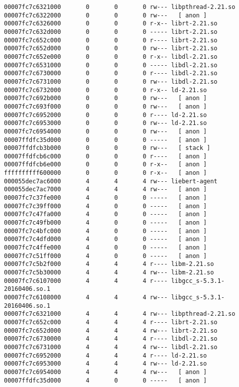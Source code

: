 \begin{verbatim}
00007fc7c6321000       0       0       0 rw--- libpthread-2.21.so
00007fc7c6322000       0       0       0 rw---   [ anon ]
00007fc7c6326000       0       0       0 r-x-- librt-2.21.so
00007fc7c632d000       0       0       0 ----- librt-2.21.so
00007fc7c652c000       0       0       0 r---- librt-2.21.so
00007fc7c652d000       0       0       0 rw--- librt-2.21.so
00007fc7c652e000       0       0       0 r-x-- libdl-2.21.so
00007fc7c6531000       0       0       0 ----- libdl-2.21.so
00007fc7c6730000       0       0       0 r---- libdl-2.21.so
00007fc7c6731000       0       0       0 rw--- libdl-2.21.so
00007fc7c6732000       0       0       0 r-x-- ld-2.21.so
00007fc7c692b000       0       0       0 rw---   [ anon ]
00007fc7c693f000       0       0       0 rw---   [ anon ]
00007fc7c6952000       0       0       0 r---- ld-2.21.so
00007fc7c6953000       0       0       0 rw--- ld-2.21.so
00007fc7c6954000       0       0       0 rw---   [ anon ]
00007ffdfc35d000       0       0       0 -----   [ anon ]
00007ffdfcb3b000       0       0       0 rw---   [ stack ]
00007ffdfcb6c000       0       0       0 r----   [ anon ]
00007ffdfcb6e000       0       0       0 r-x--   [ anon ]
ffffffffff600000       0       0       0 r-x--   [ anon ]
000055dec7ac6000       4       4       4 rw--- liebert-agent
000055dec7ac7000       4       4       4 rw---   [ anon ]
00007fc7c37fe000       4       0       0 -----   [ anon ]
00007fc7c39ff000       4       0       0 -----   [ anon ]
00007fc7c47fa000       4       0       0 -----   [ anon ]
00007fc7c49fb000       4       0       0 -----   [ anon ]
00007fc7c4bfc000       4       0       0 -----   [ anon ]
00007fc7c4dfd000       4       0       0 -----   [ anon ]
00007fc7c4ffe000       4       0       0 -----   [ anon ]
00007fc7c51ff000       4       0       0 -----   [ anon ]
00007fc7c5b2f000       4       4       4 r---- libm-2.21.so
00007fc7c5b30000       4       4       4 rw--- libm-2.21.so
00007fc7c6107000       4       4       4 r---- libgcc_s-5.3.1-20160406.so.1
00007fc7c6108000       4       4       4 rw--- libgcc_s-5.3.1-20160406.so.1
00007fc7c6321000       4       4       4 rw--- libpthread-2.21.so
00007fc7c652c000       4       4       4 r---- librt-2.21.so
00007fc7c652d000       4       4       4 rw--- librt-2.21.so
00007fc7c6730000       4       4       4 r---- libdl-2.21.so
00007fc7c6731000       4       4       4 rw--- libdl-2.21.so
00007fc7c6952000       4       4       4 r---- ld-2.21.so
00007fc7c6953000       4       4       4 rw--- ld-2.21.so
00007fc7c6954000       4       4       4 rw---   [ anon ]
00007ffdfc35d000       4       0       0 -----   [ anon ]

\end{verbatim}
